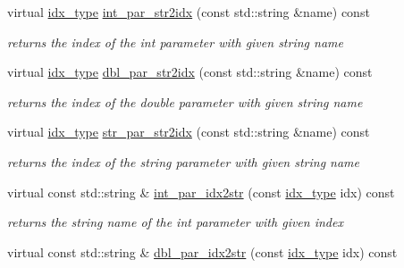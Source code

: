 \begin{Indent}
\begin{DoxyCompactItemize}
virtual \mbox{\hyperlink{class_s_m_spp__di__unipi__it_1_1_thin_compute_interface_aa3d710629ad8c434286726ad810c3b47}{idx\+\_\+type}} \mbox{\hyperlink{class_s_m_spp__di__unipi__it_1_1_thin_compute_interface_a69c6857c4288135135e8b6bbcf24252a}{int\+\_\+par\+\_\+str2idx}} (const std\+::string \&name) const
\begin{DoxyCompactList}\small\item\em returns the index of the int parameter with given string name \end{DoxyCompactList}\item 
virtual \mbox{\hyperlink{class_s_m_spp__di__unipi__it_1_1_thin_compute_interface_aa3d710629ad8c434286726ad810c3b47}{idx\+\_\+type}} \mbox{\hyperlink{class_s_m_spp__di__unipi__it_1_1_thin_compute_interface_a82f363814aa27e3243ba994a1ed5f39e}{dbl\+\_\+par\+\_\+str2idx}} (const std\+::string \&name) const
\begin{DoxyCompactList}\small\item\em returns the index of the double parameter with given string name \end{DoxyCompactList}\item 
virtual \mbox{\hyperlink{class_s_m_spp__di__unipi__it_1_1_thin_compute_interface_aa3d710629ad8c434286726ad810c3b47}{idx\+\_\+type}} \mbox{\hyperlink{class_s_m_spp__di__unipi__it_1_1_thin_compute_interface_ac89d3c2e4aeb331035bc878f0f9deeae}{str\+\_\+par\+\_\+str2idx}} (const std\+::string \&name) const
\begin{DoxyCompactList}\small\item\em returns the index of the string parameter with given string name \end{DoxyCompactList}\item 
virtual const std\+::string \& \mbox{\hyperlink{class_s_m_spp__di__unipi__it_1_1_thin_compute_interface_a3d3d1ca3218d2d640614ed75a960ef01}{int\+\_\+par\+\_\+idx2str}} (const \mbox{\hyperlink{class_s_m_spp__di__unipi__it_1_1_thin_compute_interface_aa3d710629ad8c434286726ad810c3b47}{idx\+\_\+type}} idx) const
\begin{DoxyCompactList}\small\item\em returns the string name of the int parameter with given index \end{DoxyCompactList}\item 
virtual const std\+::string \& \mbox{\hyperlink{class_s_m_spp__di__unipi__it_1_1_thin_compute_interface_a1be0e4ca13f9253674bc4fa7b67fe40e}{dbl\+\_\+par\+\_\+idx2str}} (const \mbox{\hyperlink{class_s_m_spp__di__unipi__it_1_1_thin_compute_interface_aa3d710629ad8c434286726ad810c3b47}{idx\+\_\+type}} idx) const

\end{DoxyCompactItemize}
\end{Indent}
